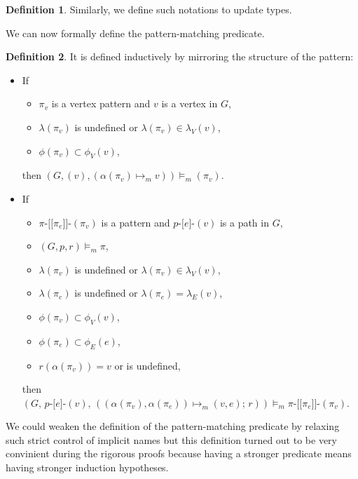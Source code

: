 \documentclass[14pt]{constructor-thesis}
\theoremstyle{definition}
\newtheorem{definition}{Definition}
\newcommand{\pathstart}[1]{(#1)}
\newcommand{\pathhop}[3]{#1 \texttt{-[} #2 \texttt{]-} (#3)}
\newcommand{\patternstart}[1]{(#1)}
\newcommand{\patternhop}[3]{#1 \texttt{-[[} #2 \texttt{]]-} (#3)}
\begin{document}
\begin{definition}
  Similarly, we define such notations to update types.
\end{definition}

We can now formally define the pattern-matching predicate.
\begin{definition}
  It is defined inductively by mirroring the structure of the pattern:
  \begin{itemize}
    \item If
      \begin{itemize}
        \item $\pi_v$ is a vertex pattern and $v$ is a vertex in $G$,
        \item $\lambda (\pi_v)$ is undefined or $\lambda (\pi_v) \in \lambda_V(v)$,
        \item $\phi (\pi_v) \subset \phi_V (v)$,
      \end{itemize}
      then $(G, \pathstart{v}, (\alpha (\pi_v) \mapsto_m v)) \models_m \patternstart{\pi_v}$.
    \item If
      \begin{itemize}
        \item $\patternhop{\pi}{\pi_e}{\pi_v}$ is a pattern and $\pathhop{p}{e}{v}$ is a path in $G$,
        \item $(G, p, r) \models_m \pi$,
        \item $\lambda (\pi_v)$ is undefined or $\lambda (\pi_v) \in \lambda_V(v)$,
        \item $\lambda (\pi_e)$ is undefined or $\lambda (\pi_e) = \lambda_E(v)$,
        \item $\phi (\pi_v) \subset \phi_V (v)$,
        \item $\phi (\pi_e) \subset \phi_E (e)$,
        \item $r(\alpha(\pi_v)) = v$ or is undefined,
      \end{itemize}
      then $(G, \, \pathhop{p}{e}{v}, \,((\alpha (\pi_v), \alpha (\pi_e)) \mapsto_m (v, e); \, r)) \models_m \patternhop{\pi}{\pi_e}{\pi_v}$.
  \end{itemize}
  
\end{definition}

We could weaken the definition of the pattern-matching predicate by relaxing such strict control of implicit names but this definition turned out to be very convinient during the rigorous proofs because having a stronger predicate means having stronger induction hypotheses.
\end{document}

